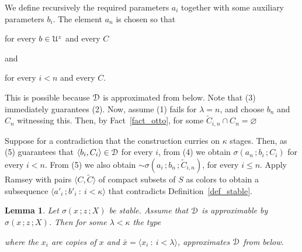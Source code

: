 \documentclass{amsproc}
\makeatletter
\newcounter{thm}
\theoremstyle{mio}
\newtheorem{lemma}[thm]{Lemma}\tcolorboxenvironment{lemma}{mythm}
\providecommand{\proofNameStyle}{\bfseries}
\renewenvironment{proof}[1][\proofname]{\par
  \pushQED{\qed}%
  \normalfont%
  \trivlist
  \item[\hskip\labelsep
        \proofNameStyle
    #1\@addpunct{.}]\ignorespaces
}{%
  \popQED\endtrivlist\@endpefalse
}
\makeatother
\begin{document}
\begin{proof}
  We define recursively the required parameters $a_i$ together with some auxiliary parameters $b_i$.
  The element $a_n$ is chosen so that

\hfill for every $b\in{\EuScript U}^z$ and every $C$

and

\hfill for every $i<n$ and every $C$.\smallskip

This is possible because ${\EuScript D}$ is approximated from below.
Note that (3) immediately guarantees (2).
Now, assume (1) fails for $\lambda=n$, and choose $b_n$ and $C_n$ witnessing this.
Then, by Fact~\ref{fact_otto}, for some $\tilde C_{i,n}\cap C_n=\varnothing$


Suppose for a contradiction that the construction curries on $\kappa$ stages.
Then, as (5) guarantees that $\langle b_i,C_i\rangle\in{\EuScript D}$ for every $i$, from (4) we obtain $\sigma(a_n\,;b_i\,;C_i)$ for every $i<n$.
From (5) we also obtain ${\sim}\sigma(a_i\,;b_n\,;\tilde C_{i,n})$, for every $i\le n$.
Apply Ramsey with pairs $\langle C,\tilde C\rangle$ of compact subsets of $S$ as colors to obtain a subsequence $\langle a'_i\,;b'_i\ :\ i<\kappa\rangle$ that contradicts Definition~\ref{def_stable}.
\end{proof}

\begin{lemma}
  Let $\sigma(x\,;z\,;X)$ be stable.
  Assume that ${\EuScript D}$ is approximable by $\sigma(x\,;z\,;X)$.
  Then for some $\lambda<\kappa$ the type\medskip 

  \smallskip
  
  where the $x_i$ are copies of $x$ and $\bar x=\langle x_i\ :\ i<\lambda\rangle$,
  approximates ${\EuScript D}$ from below.
\end{lemma}
\end{document}
